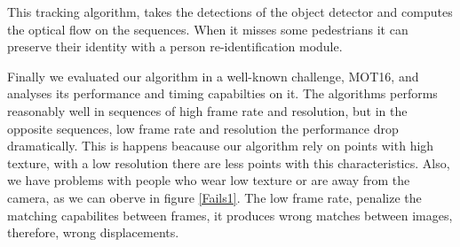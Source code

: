 \documentclass[12pt, a4paper, titlepage,twoside,openright]{article}
\begin{document}
This tracking algorithm, takes the detections of the object detector and computes the optical flow on the sequences. When it misses some pedestrians it can preserve their identity with a person re-identification module.

Finally we evaluated our algorithm in a well-known challenge, MOT16, and analyses its performance and timing capabilties on it. The algorithms performs reasonably well in sequences of high frame rate and resolution, but in the opposite sequences, low frame rate and resolution the performance drop dramatically. This is happens beacause our algorithm rely on points with high texture, with a low resolution there are less points with this characteristics. Also, we have problems with people who wear low texture or are away from the camera, as we can oberve in figure \ref{Fails1}. The low frame rate, penalize the matching capabilites between frames, it produces wrong matches between images, therefore, wrong displacements.
\end{document}
